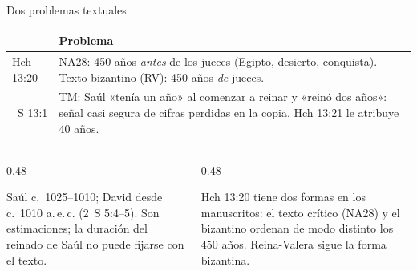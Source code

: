 \begin{frame}{Dos problemas textuales}
\footnotesize\renewcommand{\arraystretch}{1.25}
\begin{tabular}{>{\RaggedRight\arraybackslash}p{1.9cm}>{\RaggedRight\arraybackslash}p{10.1cm}}
\toprule
{\color{ladrillo}\bfseries Texto} & {\color{ladrillo}\bfseries Problema}\\\midrule
Hch 13:20 & NA28: 450 años \emph{antes} de los jueces (Egipto, desierto, conquista). Texto bizantino (RV): 450 años \emph{de} jueces.\\
1~S 13:1 & TM: Saúl «tenía un año» al comenzar a reinar y «reinó dos años»: señal casi segura de cifras perdidas en la copia. Hch 13:21 le atribuye 40 años.\\
\bottomrule
\end{tabular}
\elabpropia
\vspace{8pt}
\begin{columns}[T,onlytextwidth]
\begin{column}{0.48\textwidth}
\begin{notalam}
Saúl c.~1025--1010; David desde c.~1010 a.\,e.\,c. (2~S 5:4--5). Son estimaciones; la duración del reinado de Saúl no puede fijarse con el texto.
\end{notalam}
\end{column}
\begin{column}{0.48\textwidth}
\begin{notalam}
Hch 13:20 tiene dos formas en los manuscritos: el texto crítico (NA28) y el bizantino ordenan de modo distinto los 450 años. Reina-Valera sigue la forma bizantina.
\end{notalam}
\end{column}
\end{columns}
\end{frame}

